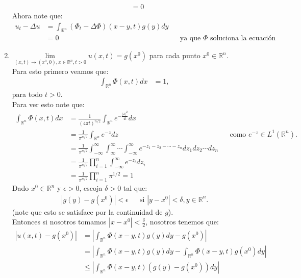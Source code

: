 \begin{homeworkProblem}
\begin{solucion}
\begin{enumerate}
\begin{align*}
          &=0
        \end{align*}
        Ahora note que:
        \begin{align*}
          u_t-\Delta u&=\int_{\mathbb{R}^{n}}(\Phi_t-\Delta\Phi)(x-y,t)g(y)dy\\
          &=0 &&\text{ya que $\Phi$ soluciona la ecuación del calor.}
        \end{align*}
        \demostrado
      \item $\underset{(x,t)\rightarrow(x^0,0),x\in\mathbb{R}^{n},t>0}{\lim}u(x,t)=g(x^0)$ para cada punto $x^0\in\mathbb{R}^{n}$.\\
      Para esto primero veamos que:
      \begin{align*}
        \int_{\mathbb{R}^{n}}\Phi(x,t)dx&=1,
      \end{align*}
      para todo $t>0$.\\
      Para ver esto note que:
      \begin{align*}
        \int_{\mathbb{R}^{n}}\Phi(x,t)dx&=\frac{1}{(4\pi t)^{n/2}}\int_{\mathbb{R}^{n}}e^{-\frac{|x|^2}{4t}}dx\\
        &=\frac{1}{\pi^{n/2}}\int_{\mathbb{R}^{n}}e^{-z}dz &&\text{como $e^{-z}\in L^1(\mathbb{R}^{n})$.}\\
        &=\frac{1}{\pi^{n/2}}\int_{-\infty}^{\infty}\int_{\infty}^{\infty}\cdots \int_{-\infty}^{\infty}e^{-z_1-z_2-\cdots-z_n}dz_1dz_2\cdots dz_n\\
        &=\frac{1}{\pi^{n/2}}\prod_{i=1}^{n}\int_{-\infty}^{\infty}e^{-z_i}dz_i\\
        &=\frac{1}{\pi^{n/2}}\prod_{i=1}^{n}\pi^{1/2}=1
      \end{align*}
      Dado $x^0\in \mathbb{R}^{n}$ y $\epsilon>0$, escoja $\delta>0$ tal que:
      \begin{align*}
        |g(y)-g(x^0)|<\epsilon &&\text{si }|y-x^0|<\delta,y\in\mathbb{R}^{n}.
      \end{align*}
      (note que esto se satisface por la continuidad de $g$).\\
      Entonces si nosotros tomamos $|x-x^0|<\frac{\delta}{2}$, nosotros tenemos que:
      \begin{align*}
        |u(x,t)-g(x^0)|&=\left|\int_{\mathbb{R}^{n}}\Phi(x-y,t)g(y)dy-g(x^0)\right|\\
        &=\left|\int_{\mathbb{R}^{n}}\Phi(x-y,t)g(y)dy-\int_{\mathbb{R}^{n}}\Phi(x-y,t)g(x^0)dy\right|\\
        &\leq \left| \int_{\mathbb{R}^{n}}\Phi(x-y,t)(g(y)-g(x^0))dy \right|\\

\end{align*}
\end{enumerate}
\end{solucion}
\end{homeworkProblem}
